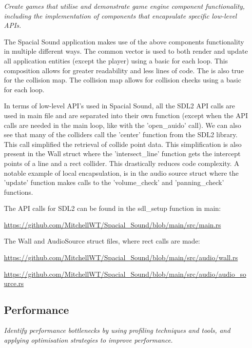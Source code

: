\documentclass{article}
\begin{document}
\emph{Create games that utilise and demonstrate game engine component functionality, including the implementation of components that encapsulate specific low-level APIs.}

\medskip

The Spacial Sound application makes use of the above components functionality in multiple different ways. The common vector is used to both render and update all application entities (except the player) using a basic for each loop. This composition allows for greater readability and less lines of code. The is also true for the collision map. The collision map allows for collision checks using a basic for each loop.

\smallskip 

In terms of low-level API's used in Spacial Sound, all the SDL2 API calls are used in main file and are separated into their own function (except when the API calls are needed in the main loop, like with the 'open\_auido' call). We can also see that many of the colliders call the 'center' function from the SDL2 library. This call simplified the retrieval of collide point data. This simplification is also present in the Wall struct where the 'intersect\_line' function gets the intercept points of a line and a rect collider. This drastically reduces code complexity. A notable example of local encapsulation, is in the audio source struct where the 'update' function makes calls to the 'volume\_check' and 'panning\_check' functions.

\medskip

The API calls for SDL2 can be found in the sdl\_setup function in main:

\url{https://github.com/MitchellWT/Spacial_Sound/blob/main/src/main.rs}

\smallskip

The Wall and AudioSource struct files, where rect calls are made:

\url{https://github.com/MitchellWT/Spacial_Sound/blob/main/src/audio/wall.rs}

\url{https://github.com/MitchellWT/Spacial_Sound/blob/main/src/audio/audio_source.rs}

\subsection*{Performance}

\emph{Identify performance bottlenecks by using profiling techniques and tools, and applying optimisation strategies to improve performance.}
\end{document}

